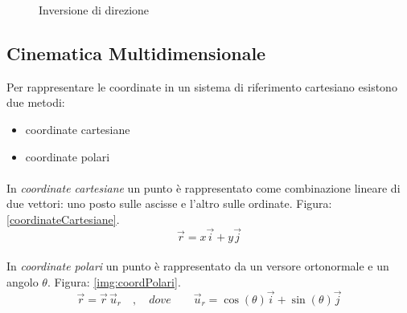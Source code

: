 \begin{figure}[H]
\begin{minipage}[c]{0.40\textwidth}
\caption{Inversione di direzione}
\label{img:TIKZmotoUniformementeAcc}
\end{minipage}
\end{figure}

\subsection{Cinematica Multidimensionale}
Per rappresentare le coordinate in un sistema di riferimento cartesiano esistono due metodi:
\begin{itemize}
    \item coordinate cartesiane
    \item coordinate polari
\end{itemize}

\paragraph{}
In \textit{coordinate cartesiane} un punto è rappresentato come combinazione lineare di due vettori: uno posto sulle ascisse e l'altro sulle ordinate. Figura: \ref{coordinateCartesiane}.
\begin{equation*}
    \vec{r} = x\vec{i} + y\vec{j}
\end{equation*}

\paragraph{}
In \textit{coordinate polari} un punto è rappresentato da un versore ortonormale e un angolo $\theta$. Figura: \ref{img:coordPolari}.
\begin{equation*}
    \vec{r} = \vec{r}\,\vec{u}_r \quad,\quad{} dove \qquad{}\vec{u}_r  = \cos({\theta})\vec{i} + \sin({\theta})\vec{j}
\end{equation*}

